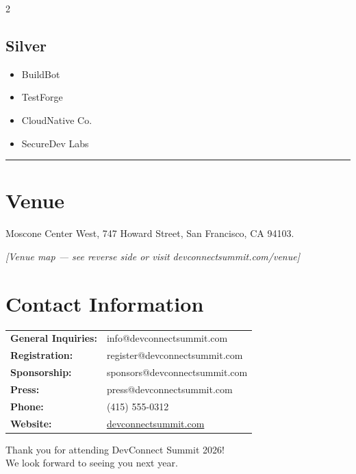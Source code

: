 \documentclass[
    language=english,
    doctype=program,
    institution=none,
]{../../omnilatex}
\begin{document}
\begin{multicols}{2}
\subsection*{Silver}
\begin{itemize}[leftmargin=*, nosep]
    \item BuildBot
    \item TestForge
    \item CloudNative Co.
    \item SecureDev Labs
\end{itemize}

\end{multicols}

\vspace{0.5em}
\noindent\rule{\textwidth}{0.4pt}
\vspace{0.5em}

\section*{Venue}

Moscone Center West, 747 Howard Street, San Francisco, CA 94103.

\begin{center}
    \textit{[Venue map --- see reverse side or visit
    devconnectsummit.com/venue]}
\end{center}

\vspace{0.5em}

\section*{Contact Information}

\begin{tabular}{ll}
    \textbf{General Inquiries:} & info@devconnectsummit.com \\
    \textbf{Registration:}      & register@devconnectsummit.com \\
    \textbf{Sponsorship:}       & sponsors@devconnectsummit.com \\
    \textbf{Press:}             & press@devconnectsummit.com \\
    \textbf{Phone:}             & (415) 555-0312 \\
    \textbf{Website:}           & \href{https://devconnectsummit.com}{devconnectsummit.com} \\
\end{tabular}

\vspace{1em}

\begin{center}
    {\small Thank you for attending DevConnect Summit 2026!}\\
    {\small We look forward to seeing you next year.}
\end{center}
\end{document}
